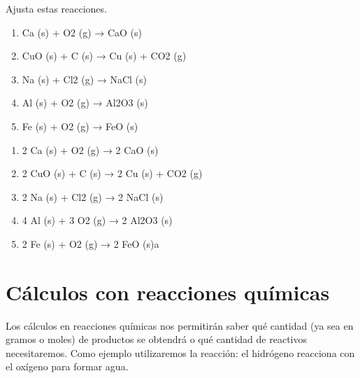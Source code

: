 \begin{exercise}
    Ajusta estas reacciones.
    \begin{enumerate}[label=\letraminuscula]
            \item Ca (s) + O2 (g) → CaO (s)
            \item CuO (s) + C (s) → Cu (s) + CO2 (g)
            \item Na (s) + Cl2 (g) → NaCl (s)
            \item Al (s) + O2 (g) → Al2O3 (s)
            \item Fe (s) + O2 (g) → FeO (s)
    \end{enumerate}
    \begin{solu}
        \begin{enumerate}[label=\letraminuscula]
                \item 2 Ca (s) + O2 (g) → 2 CaO (s)
                \item 2 CuO (s) + C (s) → 2 Cu (s) + CO2 (g)
                \item 2 Na (s) + Cl2 (g) → 2 NaCl (s)
                \item 4 Al (s) + 3 O2 (g) → 2 Al2O3 (s)
                \item 2 Fe (s) + O2 (g) → 2 FeO (s)a
        \end{enumerate}
    \end{solu}
\end{exercise}


\section{Cálculos con reacciones químicas}

Los cálculos en reacciones químicas nos permitirán saber qué cantidad (ya sea en gramos o moles) de productos se obtendrá o qué cantidad de reactivos necesitaremos.
Como ejemplo utilizaremos la reacción: el hidrógeno reacciona con el oxígeno para formar agua.

